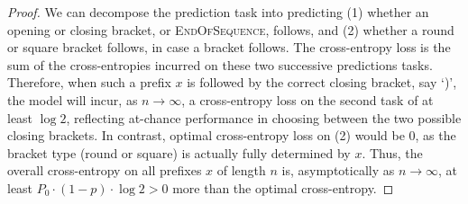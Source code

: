 \documentclass[11pt,a4paper]{article}
\begin{document}
\begin{proof}
We can decompose the prediction task into predicting (1) whether an opening or closing bracket, or \textsc{EndOfSequence}, follows, and (2) whether a round or square bracket follows, in case a bracket follows.
The cross-entropy loss is the sum of the cross-entropies incurred on these two successive predictions tasks.
Therefore, when such a prefix $x$ is followed by the correct closing bracket, say `)', the model will incur, as $n \rightarrow \infty$, a cross-entropy loss on the second task of at least $\log 2$, reflecting at-chance performance in choosing between the two possible closing brackets.
In contrast, optimal cross-entropy loss on (2) would be $0$, as the bracket type (round or square) is actually fully determined by $x$.
Thus, the overall cross-entropy on all prefixes $x$ of length $n$ is, asymptotically as $n \rightarrow \infty$, at least $ P_0 \cdot (1-p) \cdot \log 2 > 0$ more than the optimal cross-entropy.
\end{proof}
\end{document}
